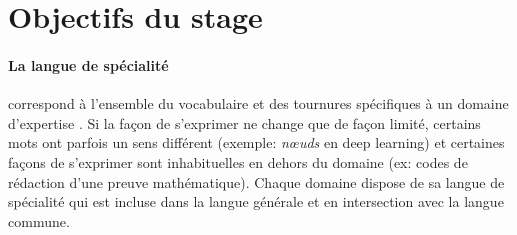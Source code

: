 

    
\section{Objectifs du stage}






\paragraph{La langue de spécialité} correspond à l'ensemble du vocabulaire et des tournures spécifiques à un domaine d'expertise \cite{cabre_terminologie_1998}. Si la façon de s'exprimer ne change que de façon limité, certains mots ont parfois un sens différent (exemple: \textit{nœuds} en deep learning) et certaines façons de s'exprimer sont inhabituelles en dehors du domaine (ex: codes de rédaction d'une preuve mathématique). Chaque domaine dispose de sa langue de spécialité qui est incluse dans la langue générale et en intersection avec la langue commune.

